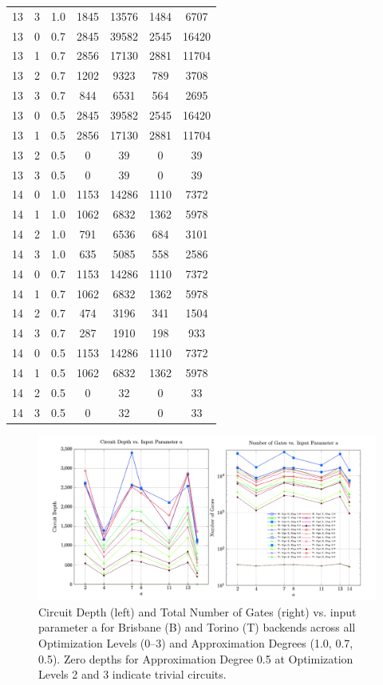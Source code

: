 \documentclass[conference,twoside]{IEEEtran}
\begin{document}
\begin{table}
\begin{longtable}{c c c S S S S}
        13 & 3 & 1.0 & 1845 & 13576 & 1484 & 6707 \\
        13 & 0 & 0.7 & 2845 & 39582 & 2545 & 16420 \\
        13 & 1 & 0.7 & 2856 & 17130 & 2881 & 11704 \\
        13 & 2 & 0.7 & 1202 & 9323 & 789 & 3708 \\
        13 & 3 & 0.7 & 844 & 6531 & 564 & 2695 \\
        13 & 0 & 0.5 & 2845 & 39582 & 2545 & 16420 \\
        13 & 1 & 0.5 & 2856 & 17130 & 2881 & 11704 \\
        13 & 2 & 0.5 & 0 & 39 & 0 & 39 \\
        13 & 3 & 0.5 & 0 & 39 & 0 & 39 \\
        14 & 0 & 1.0 & 1153 & 14286 & 1110 & 7372 \\
        14 & 1 & 1.0 & 1062 & 6832 & 1362 & 5978 \\
        14 & 2 & 1.0 & 791 & 6536 & 684 & 3101 \\
        14 & 3 & 1.0 & 635 & 5085 & 558 & 2586 \\
        14 & 0 & 0.7 & 1153 & 14286 & 1110 & 7372 \\
        14 & 1 & 0.7 & 1062 & 6832 & 1362 & 5978 \\
        14 & 2 & 0.7 & 474 & 3196 & 341 & 1504 \\
        14 & 3 & 0.7 & 287 & 1910 & 198 & 933 \\
        14 & 0 & 0.5 & 1153 & 14286 & 1110 & 7372 \\
        14 & 1 & 0.5 & 1062 & 6832 & 1362 & 5978 \\
        14 & 2 & 0.5 & 0 & 32 & 0 & 33 \\
        14 & 3 & 0.5 & 0 & 32 & 0 & 33 \\
    \end{longtable}
\end{table}

\begin{figure}[htbp]
    \centering
    \includegraphics[width=2\columnwidth]{CD_and_Gates_wrt_a.png}
    \caption{Circuit Depth (left) and Total Number of Gates (right) vs. input parameter a for Brisbane (B) and Torino (T) backends across all Optimization Levels (0–3) and Approximation Degrees (1.0, 0.7, 0.5). Zero depths for Approximation Degree 0.5 at Optimization Levels 2 and 3 indicate trivial circuits.}
    \label{fig:CD_Gates}
\end{figure}
\end{document}
